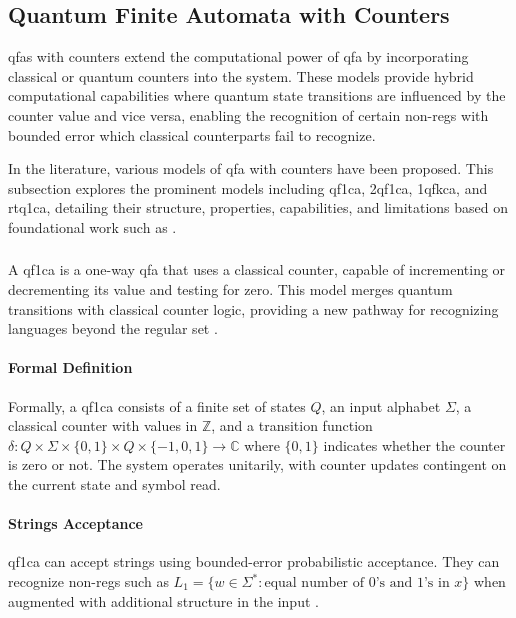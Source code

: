 \subsection{Quantum Finite Automata with Counters}
\label{sec:qfa-with-counters}

\glspl{qfa} with counters extend the computational power of \gls{qfa} by incorporating classical or quantum counters into the system. These models provide hybrid computational capabilities where quantum state transitions are influenced by the counter value and vice versa, enabling the recognition of certain non-\glspl{reg} with bounded error which classical counterparts fail to recognize.

In the literature, various models of \gls{qfa} with counters have been proposed. This subsection explores the prominent models including \gls{qf1ca}, \gls{2qf1ca}, \gls{1qfkca}, and \gls{rtq1ca}, detailing their structure, properties, capabilities, and limitations based on foundational work such as \cite{bonner2001quantum, kravtsev1999quantum, pani2011empowering, cem2012quantum}.

\subsubsection{}

A \gls{qf1ca} is a one-way \gls{qfa} that uses a classical counter, capable of incrementing or decrementing its value and testing for zero. This model merges quantum transitions with classical counter logic, providing a new pathway for recognizing languages beyond the regular set \cite{kravtsev1999quantum}.

\paragraph{Formal Definition} 
Formally, a \gls{qf1ca} consists of a finite set of states $Q$, an input alphabet $\Sigma$, a classical counter with values in $\mathbb{Z}$, and a transition function $\delta: Q \times \Sigma \times \{0,1\} \times Q \times \{-1,0,1\} \rightarrow \mathbb{C}$ where $\{0,1\}$ indicates whether the counter is zero or not. The system operates unitarily, with counter updates contingent on the current state and symbol read.

\paragraph{Strings Acceptance} 
\gls{qf1ca} can accept strings using bounded-error probabilistic acceptance. They can recognize non-\glspl{reg} such as $L_1 = \{ w \in \Sigma^* : \text{equal number of 0's and 1's in } x \}$ when augmented with additional structure in the input \cite{bonner2001quantum}.

